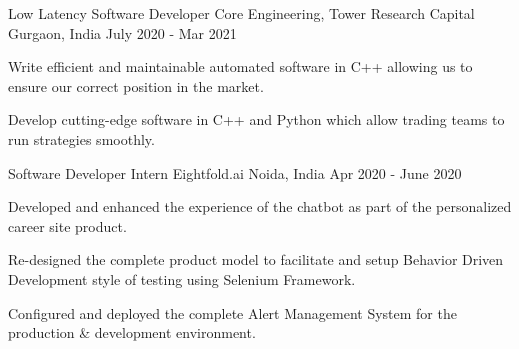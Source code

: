 \begin{cventries}

  \cventry
    {Low Latency Software Developer} %
    {Core Engineering, Tower Research Capital} %
    {Gurgaon, India} %
    {July 2020 - Mar 2021} %
    {
      \begin{cvitems} %
        \item {Write efficient and maintainable automated software in C++ allowing us to ensure our correct position in the market.}
        \item {Develop cutting-edge software in C++ and Python which allow trading teams to run strategies smoothly.}
      \end{cvitems}
    }


  \cventry
    {Software Developer Intern} %
    {Eightfold.ai} %
    {Noida, India} %
    {Apr 2020 - June 2020} %
    {
      \begin{cvitems} %
        \item {Developed and enhanced the experience of the chatbot as part of the personalized career site product.}
        \item {Re-designed the complete product model to facilitate and setup Behavior Driven Development style of testing using Selenium Framework.}
        \item {Configured and deployed the complete Alert Management System for the production \& development environment.}
      \end{cvitems}
    }



\end{cventries}
